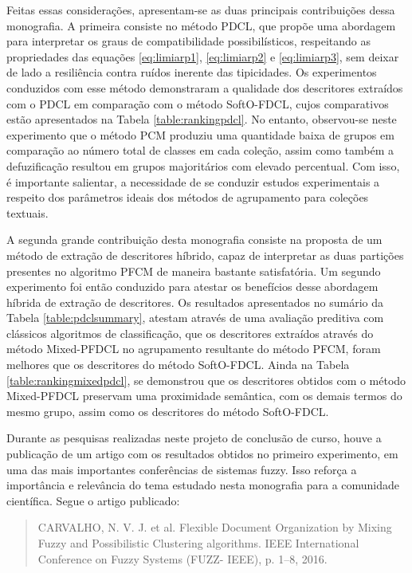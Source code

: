 Feitas essas considerações, apresentam-se as duas principais contribuições dessa monografia. A primeira consiste no
método PDCL, que propõe uma abordagem para interpretar os graus de compatibilidade possibilísticos,
respeitando as propriedades das equações \ref{eq:limiarp1}, \ref{eq:limiarp2} e \ref{eq:limiarp3},
sem deixar de lado a resiliência contra ruídos inerente das tipicidades. Os experimentos conduzidos
com esse método demonstraram a qualidade dos descritores extraídos com o PDCL em comparação com o
método SoftO-FDCL, cujos comparativos estão apresentados na Tabela \ref{table:rankingpdcl}. No entanto, observou-se
neste experimento que o método PCM produziu uma quantidade baixa de grupos em comparação ao número
total de classes em cada coleção, assim como também a defuzificação resultou em grupos majoritários
com elevado percentual. Com isso, é importante salientar, a necessidade de se conduzir estudos
experimentais a respeito dos parâmetros ideais dos métodos de agrupamento para coleções textuais.

A segunda grande contribuição desta monografia consiste na proposta de um método de extração de
descritores híbrido, capaz de interpretar as duas partições presentes no algoritmo PFCM de maneira
bastante satisfatória. Um segundo experimento foi então conduzido para atestar os
benefícios desse abordagem híbrida de extração de descritores. Os resultados apresentados no sumário
da Tabela \ref{table:pdclsummary}, atestam através de uma avaliação preditiva com clássicos
algoritmos de classificação, que os descritores extraídos através do método Mixed-PFDCL no
agrupamento resultante do método PFCM, foram melhores que os descritores do método SoftO-FDCL.
Ainda na Tabela \ref{table:rankingmixedpdcl}, se demonstrou que os descritores obtidos com o método
Mixed-PFDCL preservam uma proximidade semântica, com os demais termos do mesmo grupo, assim como os
descritores do método SoftO-FDCL.

Durante as pesquisas realizadas neste projeto de conclusão de curso, houve a publicação de um artigo
com os resultados obtidos no primeiro experimento, em uma das mais importantes conferências de
sistemas fuzzy. Isso reforça a importância e relevância do tema estudado nesta monografia para a
comunidade científica. Segue o artigo publicado:
\begin{quote}
CARVALHO, N. V. J. et al. Flexible Document Organization by Mixing Fuzzy and Possibilistic
Clustering algorithms. IEEE International Conference on Fuzzy Systems (FUZZ- IEEE), p. 1–8, 2016.
\end{quote}

